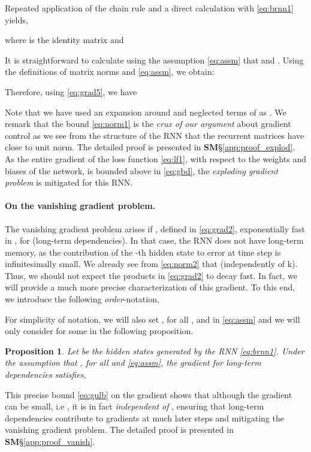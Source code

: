 \documentclass{article} \usepackage{iclr2021_conference,times}
\newtheorem{proposition}[theorem]{Proposition}
\begin{document}
Repeated application of the chain rule and a direct calculation with \eqref{eq:brnn1} yields,

where  is the identity matrix and 

It is straightforward to calculate using the assumption \eqref{eq:assm} that  and . Using the definitions of matrix norms and \eqref{eq:assm}, we obtain:

Therefore, using \eqref{eq:grad5}, we have 

Note that we have used an expansion around  and neglected terms of  as . We remark that the bound \eqref{eq:norm1} is the \emph{crux of our argument} about gradient control as we see from the structure of the RNN that the recurrent matrices have close to unit norm. The detailed proof is presented in {\bf SM}\S\ref{app:proof_explod}. As the entire gradient of the loss function \eqref{eq:lf1}, with respect to the weights and biases of the network, is bounded above in \eqref{eq:gbd}, the \emph{exploding gradient problem} is mitigated for this RNN.
\paragraph{On the vanishing gradient problem.} The vanishing gradient problem \citep{vanish_grad} arises if , defined in \eqref{eq:grad2},  exponentially fast in , for  (long-term dependencies). In that case, the RNN does not have long-term memory, as the contribution of the -th hidden state to error at time step  is infinitesimally small. We already see from \eqref{eq:norm2} that  (independently of k). Thus, we should not expect the products in \eqref{eq:grad2} to decay fast. In fact, we will provide a much more precise characterization of this gradient. To this end, we introduce the following \emph{order}-notation,

For simplicity of notation, we will also set , for all ,  and  in \eqref{eq:assm} and we will only consider  for some  in the following proposition.
\begin{proposition}
\label{prop:4}
Let  be the hidden states generated by the RNN \eqref{eq:brnn1}. Under the assumption that , for all  and \eqref{eq:assm}, the gradient for long-term dependencies satisfies,

\end{proposition}
This precise bound \eqref{eq:gulb} on the gradient shows that although the gradient can be small, i.e , it is in fact \emph{independent of }, ensuring that long-term dependencies contribute to gradients at much later steps and mitigating the vanishing gradient problem. The detailed proof is presented in   {\bf SM}\S\ref{app:proof_vanish}.
\end{document}
